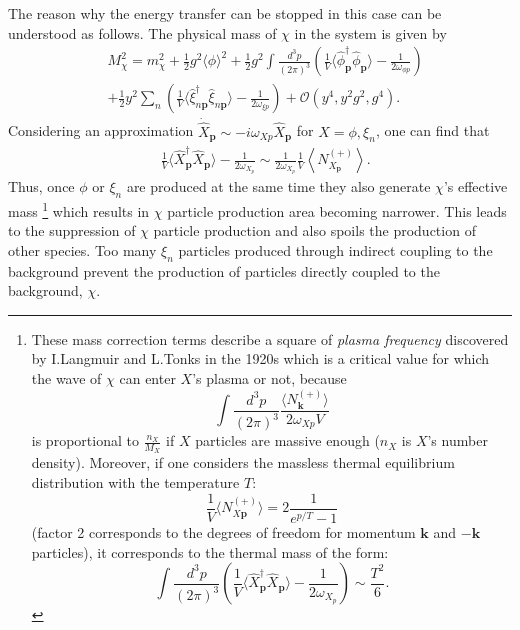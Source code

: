 \documentclass[twocolumn,showpacs,preprintnumbers,amsmath,amssymb,nofootinbib,superscriptaddress,prc]{revtex4}
\begin{document}
The reason why the energy transfer can be stopped in this case can be understood as follows. The physical mass of $\chi$ in the system is given by
\begin{eqnarray}
& \nonumber M_{\chi}^2 = m_{\chi}^2 + \frac{1}{2} g^2 \langle \phi \rangle^2 + \frac{1}{2} g^2 \int \frac{d^3 p}{(2 \pi)^3} \left( \frac{1}{V} \langle \hat{\phi}_{\textbf{p}}^{\dagger} \hat{\phi}_{\textbf{p}} \rangle - \frac{1}{2 \omega_{\phi p}} \right) \\
& + \frac{1}{2} y^2 \sum \limits_n \left( \frac{1}{V} \langle \hat{\xi}_{n \textbf{p}}^{\dagger} \hat{\xi}_{n \textbf{p}} \rangle - \frac{1}{2 \omega_{\xi p}} \right) + \mathcal{O} (y^4, y^2 g^2, g^4).
\end{eqnarray}
Considering an approximation $\dot{\hat{X}}_{\textbf{p}} \sim -i \omega_{X p} \hat{X}_{\textbf{p}} $ for \mbox{$X = \phi, \xi_n $}, one can find that
\begin{eqnarray}
& \frac{1}{V} \langle \hat{X}^{\dagger}_{\textbf{p}} \hat{X}_{\textbf{p}} \rangle - \frac{1}{2 \omega_{X_p}} \sim \frac{1}{2 \omega_{X_p}} \frac{1}{V} \left \langle N^{(+)}_{X_\textbf{p}} \right \rangle.
\end{eqnarray}
Thus, once $\phi$ or $\xi_n$ are produced at the same time they also generate $\chi$'s effective mass \footnote{These mass correction terms describe a square of \textit{plasma frequency} discovered by I.Langmuir and L.Tonks in the 1920s which is a critical value for which the wave of $\chi$ can enter $X$'s plasma or not, because 
\begin{equation}
\nonumber \int\frac{d^3p}{(2\pi)^3}\frac{\langle N_{\mathbf{k}}^{(+)}\rangle}{2\omega_{Xp}V}
\end{equation}
is proportional to $\frac{n_X}{M_X}$ if $X$ particles are massive enough ($n_X$ is $X$'s number density). Moreover, if one considers the massless thermal equilibrium distribution with the temperature $T$: 
\begin{equation}
\nonumber \frac{1}{V} \langle N^{(+)}_{X \textbf{p}} \rangle = 2 \frac{1}{e^{p/T} - 1}
\end{equation}
(factor 2 corresponds to the degrees of freedom for momentum $\mathbf{k}$ and $\mathbf{-k}$ particles), it corresponds to the thermal mass of the form: 
\begin{equation}
\nonumber \int \frac{d^3 p}{(2 \pi)^3} \left( \frac{1}{V} \langle \hat{X}_{\textbf{p}}^{\dagger} \hat{X}_{\textbf{p}} \rangle - \frac{1}{2 \omega_{X_p}} \right) \sim \frac{T^2}{6}.
\end{equation}} which results in $\chi$ particle production area becoming narrower. This leads to the suppression of $\chi$ particle production and also spoils the production of other species. Too many $\xi_n$ particles produced through indirect coupling to the background prevent the production of particles directly coupled to the background, $\chi$. 
\end{document}
